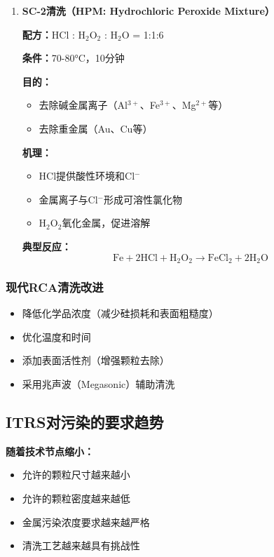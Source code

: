 \documentclass[UTF8,12pt,a4paper]{ctexart}
\begin{document}
\begin{enumerate}
    \textbf{结果：}获得氢钝化的硅表面（Si-H）
    
    \item \textbf{SC-2清洗（HPM: Hydrochloric Peroxide Mixture）}
    
    \textbf{配方：}HCl : H$_2$O$_2$ : H$_2$O = 1:1:6
    
    \textbf{条件：}70-80°C，10分钟
    
    \textbf{目的：}
    \begin{itemize}
        \item 去除碱金属离子（Al$^{3+}$、Fe$^{3+}$、Mg$^{2+}$等）
        \item 去除重金属（Au、Cu等）
    \end{itemize}
    
    \textbf{机理：}
    \begin{itemize}
        \item HCl提供酸性环境和Cl$^-$
        \item 金属离子与Cl$^-$形成可溶性氯化物
        \item H$_2$O$_2$氧化金属，促进溶解
    \end{itemize}
    
    \textbf{典型反应：}
    \begin{equation}
    \text{Fe} + 2\text{HCl} + \text{H}_2\text{O}_2 \rightarrow \text{FeCl}_2 + 2\text{H}_2\text{O}
    \end{equation}
\end{enumerate}

\subsubsection{现代RCA清洗改进}

\begin{itemize}
    \item 降低化学品浓度（减少硅损耗和表面粗糙度）
    \item 优化温度和时间
    \item 添加表面活性剂（增强颗粒去除）
    \item 采用兆声波（Megasonic）辅助清洗
\end{itemize}

\subsection{ITRS对污染的要求趋势}

\textbf{随着技术节点缩小：}
\begin{itemize}
    \item 允许的颗粒尺寸越来越小
    \item 允许的颗粒密度越来越低
    \item 金属污染浓度要求越来越严格
    \item 清洗工艺越来越具有挑战性
\end{itemize}
\end{document}

